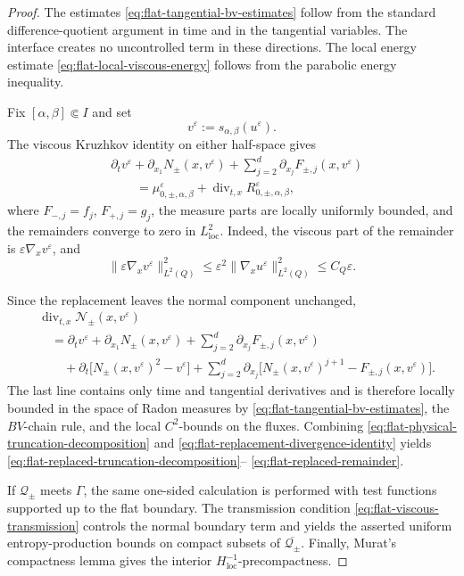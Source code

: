 \documentclass[11pt]{amsart}
\numberwithin{equation}{section}
\theoremstyle{plain}
\theoremstyle{definition}
\theoremstyle{remark}
\begin{document}
\begin{proof}
The estimates \eqref{eq:flat-tangential-bv-estimates} follow from the standard
difference-quotient argument in time and in the tangential variables. The
interface creates no uncontrolled term in these directions. The local energy
estimate \eqref{eq:flat-local-viscous-energy} follows from the parabolic
energy inequality.

Fix \([\alpha,\beta]\Subset I\) and set
\[
    v^\varepsilon:=s_{\alpha,\beta}(u^\varepsilon).
\]
The viscous Kruzhkov identity on either half-space gives
\begin{equation}
\label{eq:flat-physical-truncation-decomposition}
\begin{aligned}
&\partial_tv^\varepsilon
+\partial_{x_1}N_\pm(x,v^\varepsilon)
+\sum_{j=2}^d
    \partial_{x_j}F_{\pm,j}(x,v^\varepsilon)
\\
&\qquad=
    \mu_{0,\pm,\alpha,\beta}^\varepsilon
    +
    \operatorname{div}_{t,x}
        R_{0,\pm,\alpha,\beta}^\varepsilon,
\end{aligned}
\end{equation}
where \(F_{-,j}=f_j\), \(F_{+,j}=g_j\), the measure parts are locally
uniformly bounded, and the remainders converge to zero in
\(L^2_{\mathrm{loc}}\). Indeed, the viscous part of the remainder is
\(\varepsilon\nabla_xv^\varepsilon\), and
\[
    \|\varepsilon\nabla_xv^\varepsilon\|_{L^2(Q)}^2
    \leq
    \varepsilon^2
    \|\nabla_xu^\varepsilon\|_{L^2(Q)}^2
    \leq C_Q\varepsilon.
\]

Since the replacement leaves the normal component unchanged,
\begin{align}
\label{eq:flat-replacement-divergence-identity}
&\operatorname{div}_{t,x}
    \mathcal N_\pm(x,v^\varepsilon)
\nonumber\\
&\quad=
    \partial_tv^\varepsilon
    +\partial_{x_1}N_\pm(x,v^\varepsilon)
    +\sum_{j=2}^d
        \partial_{x_j}F_{\pm,j}(x,v^\varepsilon)
\nonumber\\
&\qquad+
    \partial_t
    \bigl[N_\pm(x,v^\varepsilon)^2-v^\varepsilon\bigr]
    +
    \sum_{j=2}^d
    \partial_{x_j}
    \bigl[N_\pm(x,v^\varepsilon)^{j+1}
          -F_{\pm,j}(x,v^\varepsilon)\bigr].
\end{align}
The last line contains only time and tangential derivatives and is therefore
locally bounded in the space of Radon measures by
\eqref{eq:flat-tangential-bv-estimates}, the \(BV\)-chain rule, and the
local \(C^2\)-bounds on the fluxes. Combining
\eqref{eq:flat-physical-truncation-decomposition} and
\eqref{eq:flat-replacement-divergence-identity} yields
\eqref{eq:flat-replaced-truncation-decomposition}--%
\eqref{eq:flat-replaced-remainder}.

If \(\mathcal Q_\pm\) meets \(\Gamma\), the same one-sided calculation is
performed with test functions supported up to the flat boundary. The
transmission condition \eqref{eq:flat-viscous-transmission} controls the
normal boundary term and yields the asserted uniform entropy-production
bounds on compact subsets of \(\overline{\mathcal Q_\pm}\). Finally,
Murat's compactness lemma gives the interior
\(H^{-1}_{\mathrm{loc}}\)-precompactness.
\end{proof}
\end{document}
